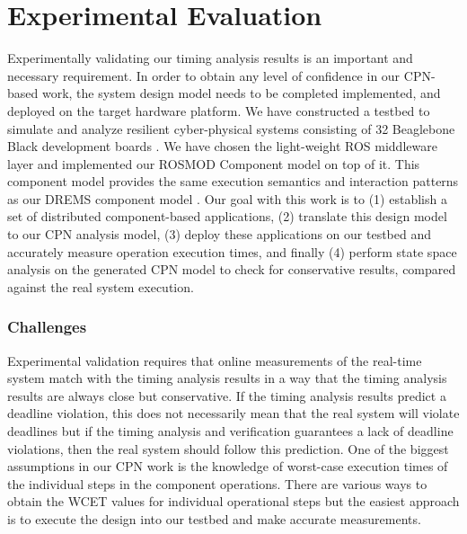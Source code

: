 \chapter{Experimental Evaluation}
\label{chapter:evaluation}

Experimentally validating our timing analysis results is an important and necessary requirement. In order to obtain any level of confidence in our CPN-based work, the system design model needs to be completed implemented, and deployed on the target hardware platform. We have constructed a testbed \cite{kumarTestbed} to simulate and analyze resilient cyber-physical systems consisting of 32 Beaglebone Black development boards \cite{BBB}. We have chosen the light-weight ROS \cite{ROS} middleware layer and implemented our ROSMOD Component model \cite{kumarROSMOD} on top of it. This component model provides the same execution semantics and interaction patterns as our DREMS component model \cite{ISIS_F6_ISORC:13}. Our goal with this work is to (1) establish a set of distributed component-based applications, (2) translate this design model to our CPN analysis model, (3) deploy these applications on our testbed and accurately measure operation execution times, and finally (4) perform state space analysis on the generated CPN model to check for conservative results, compared against the real system execution.

\subsection{Challenges}

Experimental validation requires that online measurements of the real-time system match with the timing analysis results in a way that the timing analysis results are always close but conservative. If the timing analysis results predict a deadline violation, this does not necessarily mean that the real system will violate deadlines but if the timing analysis and verification guarantees a lack of deadline violations, then the real system should follow this prediction. One of the biggest assumptions in our CPN work is the knowledge of worst-case execution times of the individual steps in the component operations. There are various ways to obtain the WCET values for individual operational steps but the easiest approach is to execute the design into our testbed and make accurate measurements.

